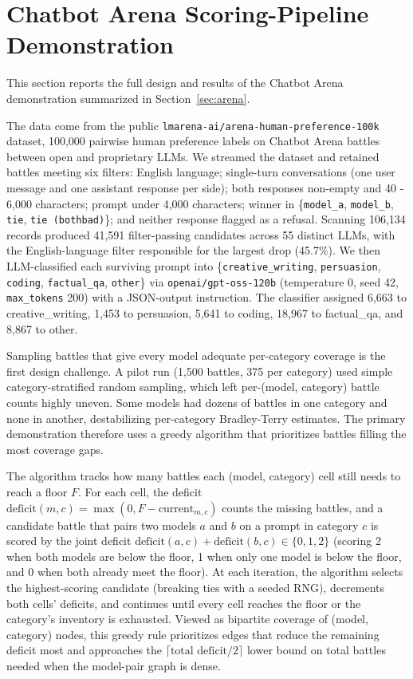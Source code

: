 \clearpage

\section{Chatbot Arena Scoring-Pipeline Demonstration}
\label{si:arena}

This section reports the full design and results of the Chatbot Arena demonstration summarized in Section~\ref{sec:arena}.

The data come from the public \texttt{lmarena-ai/arena-human-preference-100k} dataset, 100,000 pairwise human preference labels on Chatbot Arena battles between open and proprietary LLMs. We streamed the dataset and retained battles meeting six filters: English language; single-turn conversations (one user message and one assistant response per side); both responses non-empty and 40 - 6,000 characters; prompt under 4,000 characters; winner in \{\texttt{model\_a}, \texttt{model\_b}, \texttt{tie}, \texttt{tie (bothbad)}\}; and neither response flagged as a refusal. Scanning 106,134 records produced 41,591 filter-passing candidates across 55 distinct LLMs, with the English-language filter responsible for the largest drop (45.7\%). We then LLM-classified each surviving prompt into \{\texttt{creative\_writing}, \texttt{persuasion}, \texttt{coding}, \texttt{factual\_qa}, \texttt{other}\} via \texttt{openai/gpt-oss-120b} (temperature 0, seed 42, \texttt{max\_tokens} 200) with a JSON-output instruction. The classifier assigned 6,663 to creative\_writing, 1,453 to persuasion, 5,641 to coding, 18,967 to factual\_qa, and 8,867 to other.

Sampling battles that give every model adequate per-category coverage is the first design challenge. A pilot run (1,500 battles, 375 per category) used simple category-stratified random sampling, which left per-(model, category) battle counts highly uneven. Some models had dozens of battles in one category and none in another, destabilizing per-category Bradley-Terry estimates. The primary demonstration therefore uses a greedy algorithm that prioritizes battles filling the most coverage gaps.

The algorithm tracks how many battles each (model, category) cell still needs to reach a floor $F$. For each cell, the deficit $\text{deficit}(m, c) = \max(0, F - \text{current}_{m, c})$ counts the missing battles, and a candidate battle that pairs two models $a$ and $b$ on a prompt in category $c$ is scored by the joint deficit $\text{deficit}(a, c) + \text{deficit}(b, c) \in \{0, 1, 2\}$ (scoring 2 when both models are below the floor, 1 when only one model is below the floor, and 0 when both already meet the floor). At each iteration, the algorithm selects the highest-scoring candidate (breaking ties with a seeded RNG), decrements both cells' deficits, and continues until every cell reaches the floor or the category's inventory is exhausted. Viewed as bipartite coverage of (model, category) nodes, this greedy rule prioritizes edges that reduce the remaining deficit most and approaches the $\lceil \text{total deficit} / 2 \rceil$ lower bound on total battles needed when the model-pair graph is dense.

